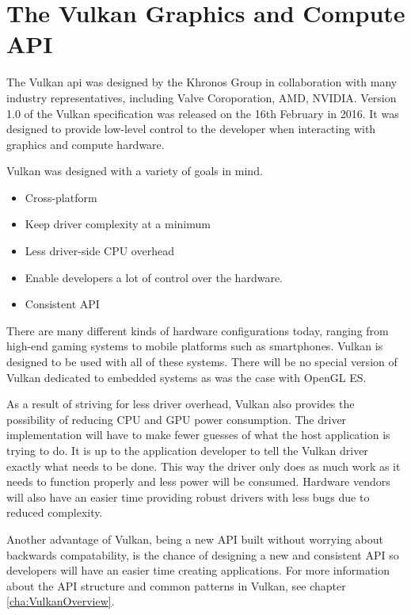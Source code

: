   \section{The Vulkan Graphics and Compute API}

    The Vulkan \acrfull{api} was designed by the Khronos Group in collaboration with many industry representatives, including Valve Coroporation, AMD, NVIDIA. Version 1.0 of the Vulkan specification was released on the 16th February in 2016. It was designed to provide low-level control to the developer when interacting with graphics and compute hardware.

    Vulkan was designed with a variety of goals in mind.

    \begin{itemize}
      \item Cross-platform
      \item Keep driver complexity at a minimum
      \item Less driver-side CPU overhead
      \item Enable developers a lot of control over the hardware.
      \item Consistent API
    \end{itemize}

    There are many different kinds of hardware configurations today, ranging from high-end gaming systems to mobile platforms such as smartphones. Vulkan is designed to be used with all of these systems. There will be no special version of Vulkan dedicated to embedded systems as was the case with OpenGL ES.

    As a result of striving for less driver overhead, Vulkan also provides the possibility of reducing CPU and GPU power consumption. The driver implementation will have to make fewer guesses of what the host application is trying to do. It is up to the application developer to tell the Vulkan driver exactly what needs to be done. This way the driver only does as much work as it needs to function properly and less power will be consumed. Hardware vendors will also have an easier time providing robust drivers with less bugs due to reduced complexity.

    Another advantage of Vulkan, being a new API built without worrying about backwards compatability, is the chance of designing a new and consistent API so developers will have an easier time creating applications. For more information about the API structure and common patterns in Vulkan, see chapter \ref{cha:VulkanOverview}.

